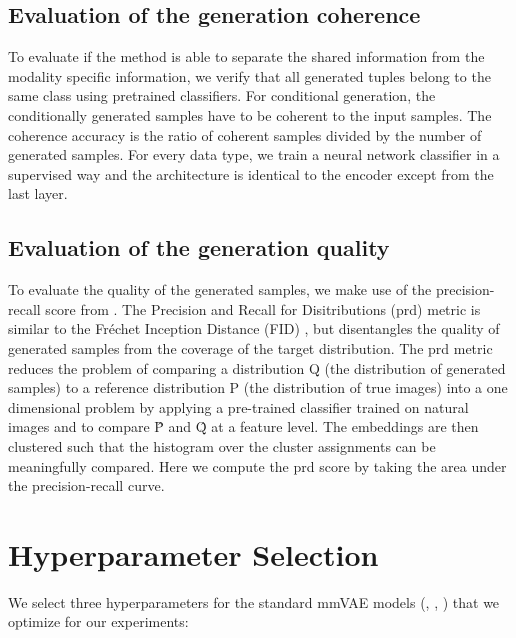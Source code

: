 \subsection{Evaluation of the generation coherence}
\label{subsubsec:gen_coh}
To evaluate if the method is able to separate the shared information from the modality specific information, we verify that all generated tuples belong to the same class using pretrained classifiers.
For conditional generation, the conditionally generated samples have to be coherent to the input samples.
The coherence accuracy is the ratio of coherent samples divided by the number of generated samples.
For every data type, we train a neural network classifier in a supervised way and the architecture is identical to the encoder except from the last layer.

\subsection{Evaluation of the generation quality}
\label{subsubsec:gen_qual}
To evaluate the quality of the generated samples, we make use of the precision-recall score from \cite{precision_recall_distributions}.
The Precision and Recall for Disitributions (prd) metric is similar to the Fréchet Inception Distance (FID) \citep{heusel_gans_2017}, but disentangles the quality of generated samples from the coverage of the target distribution.
The prd metric reduces the problem of comparing a distribution Q (the distribution of generated samples) to a reference distribution P (the distribution of true images) into a one dimensional problem by applying a pre-trained classifier trained on natural images and to compare \^{P} and \^{Q} at a feature level.
The embeddings are then clustered such that the histogram over the cluster assignments can be meaningfully compared.
Here we compute the prd score by taking the area under the precision-recall curve.


\section{Hyperparameter Selection}
\label{sec:Hyperparameter Selection}
We select three hyperparameters for the standard mmVAE models (, , ) that we optimize for our experiments:

